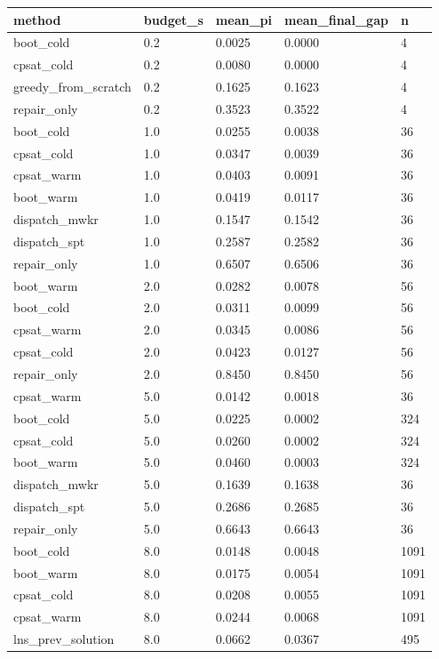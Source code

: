 \begin{table}[t]
\centering
\begin{tabular}{lllll}
\toprule
method & budget\_s & mean\_pi & mean\_final\_gap & n \\
\midrule
boot\_cold & 0.2 & 0.0025 & 0.0000 & 4 \\
cpsat\_cold & 0.2 & 0.0080 & 0.0000 & 4 \\
greedy\_from\_scratch & 0.2 & 0.1625 & 0.1623 & 4 \\
repair\_only & 0.2 & 0.3523 & 0.3522 & 4 \\
boot\_cold & 1.0 & 0.0255 & 0.0038 & 36 \\
cpsat\_cold & 1.0 & 0.0347 & 0.0039 & 36 \\
cpsat\_warm & 1.0 & 0.0403 & 0.0091 & 36 \\
boot\_warm & 1.0 & 0.0419 & 0.0117 & 36 \\
dispatch\_mwkr & 1.0 & 0.1547 & 0.1542 & 36 \\
dispatch\_spt & 1.0 & 0.2587 & 0.2582 & 36 \\
repair\_only & 1.0 & 0.6507 & 0.6506 & 36 \\
boot\_warm & 2.0 & 0.0282 & 0.0078 & 56 \\
boot\_cold & 2.0 & 0.0311 & 0.0099 & 56 \\
cpsat\_warm & 2.0 & 0.0345 & 0.0086 & 56 \\
cpsat\_cold & 2.0 & 0.0423 & 0.0127 & 56 \\
repair\_only & 2.0 & 0.8450 & 0.8450 & 56 \\
cpsat\_warm & 5.0 & 0.0142 & 0.0018 & 36 \\
boot\_cold & 5.0 & 0.0225 & 0.0002 & 324 \\
cpsat\_cold & 5.0 & 0.0260 & 0.0002 & 324 \\
boot\_warm & 5.0 & 0.0460 & 0.0003 & 324 \\
dispatch\_mwkr & 5.0 & 0.1639 & 0.1638 & 36 \\
dispatch\_spt & 5.0 & 0.2686 & 0.2685 & 36 \\
repair\_only & 5.0 & 0.6643 & 0.6643 & 36 \\
boot\_cold & 8.0 & 0.0148 & 0.0048 & 1091 \\
boot\_warm & 8.0 & 0.0175 & 0.0054 & 1091 \\
cpsat\_cold & 8.0 & 0.0208 & 0.0055 & 1091 \\
cpsat\_warm & 8.0 & 0.0244 & 0.0068 & 1091 \\
lns\_prev\_solution & 8.0 & 0.0662 & 0.0367 & 495 \\

\end{tabular}
\end{table}
